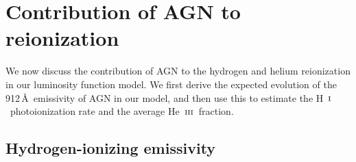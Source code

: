 \documentclass[fleqn,usenatbib]{mnras}
\def\HI{\hbox{H~$\scriptstyle\rm I$}}
\def\HeIII{\hbox{He~$\scriptstyle\rm III$}}
\def\HeIII{\hbox{He~$\scriptstyle\rm III$}}
\begin{document}


\section{Contribution of AGN to reionization}
\label{sec:reion}


We now discuss the contribution of AGN to the hydrogen and helium
reionization in our luminosity function model.  We first derive the
expected evolution of the 912\,\AA\ emissivity of AGN in our model,
and then use this to estimate the \HI\ photoionization rate and the
average \HeIII\ fraction.
\subsection{Hydrogen-ionizing emissivity}
\label{sec:e912}
\end{document}
